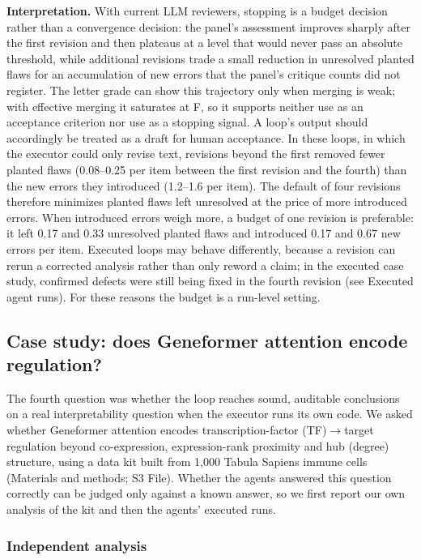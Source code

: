 \documentclass[10pt,letterpaper]{article}
\begin{document}
\textbf{Interpretation.} With current LLM reviewers, stopping is a budget decision rather than a convergence decision: the panel's assessment improves sharply after the first revision and then plateaus at a level that would never pass an absolute threshold, while additional revisions trade a small reduction in unresolved planted flaws for an accumulation of new errors that the panel's critique counts did not register. The letter grade can show this trajectory only when merging is weak; with effective merging it saturates at F, so it supports neither use as an acceptance criterion nor use as a stopping signal. A loop's output should accordingly be treated as a draft for human acceptance. In these loops, in which the executor could only revise text, revisions beyond the first removed fewer planted flaws (0.08--0.25 per item between the first revision and the fourth) than the new errors they introduced (1.2--1.6 per item). The default of four revisions therefore minimizes planted flaws left unresolved at the price of more introduced errors. When introduced errors weigh more, a budget of one revision is preferable: it left 0.17 and 0.33 unresolved planted flaws and introduced 0.17 and 0.67 new errors per item. Executed loops may behave differently, because a revision can rerun a corrected analysis rather than only reword a claim; in the executed case study, confirmed defects were still being fixed in the fourth revision (see Executed agent runs). For these reasons the budget is a run-level setting.

\subsection*{Case study: does Geneformer attention encode regulation?}

The fourth question was whether the loop reaches sound, auditable conclusions on a real interpretability question when the executor runs its own code. We asked whether Geneformer attention encodes transcription-factor (TF)$\to$target regulation beyond co-expression, expression-rank proximity and hub (degree) structure, using a data kit built from 1,000 Tabula Sapiens immune cells (Materials and methods; S3 File). Whether the agents answered this question correctly can be judged only against a known answer, so we first report our own analysis of the kit and then the agents' executed runs.

\subsubsection*{Independent analysis}
\end{document}
